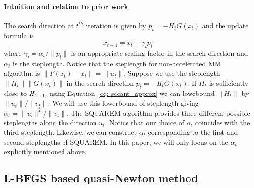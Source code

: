 \documentclass[12pt]{article}
\newcommand{\jx}[1]{{\color{blue}{ #1}}}
\begin{document}
\paragraph{Intuition and relation to prior work} 
 The search direction at $t^{th}$ iteration is given by $p_t = -H_{t}G(x_t)$ and the update formula is 
\[
x_{t+1} = x_t + \gamma_t p_t
\]
where $\gamma_t = \alpha_t /\|p_t\|$ is an appropriate scaling factor in the search direction and $\alpha_t$ is the steplength. Notice that the steplength for non-accelerated MM algorithm is $\|F(x_t) - x_t\| = \|u_t\|$. Suppose we use the steplength $\|H_t\| \|G(x_t)\|$ in the search direction $p_t = -H_tG(x_t)$. If $H_t$ is sufficiently close to $H_{t+1}$, using Equation~\ref{eq: secant_approx} we can lowebound $\|H_t\|$ by $\|u_t\|/\|v_t\|$. We will use this lowerbound of steplength giving $\alpha_t = \|u_t\|^2/\|v_t\|$. The SQUAREM algorithm provides three different possible steplengths along the direction $u_t$. Notice that our choice of $\alpha_t$ coincides with the third steplength. Likewise, we can construct $\alpha_t$ corresponding to the first and second steplengths of SQUAREM. In this paper, we will only focus on the $\alpha_t$ explicitly mentioned above.
\jx{We can further flesh out this subsection, and emphasize exactly why this is more general than the SQUAREM methods and how it sort of unifies existing methods, and also why it is potentially a better formulation than ZAL. We should close this with a discussion on the drawback that our formulation, while closer to established wisdom, leads to a Jacobian that can be unwieldy, and the design of ZAL is more immediately applicable to high-dimensional problems. This then transitions into the next section}


\subsection{L-BFGS based quasi-Newton method}
\end{document}
